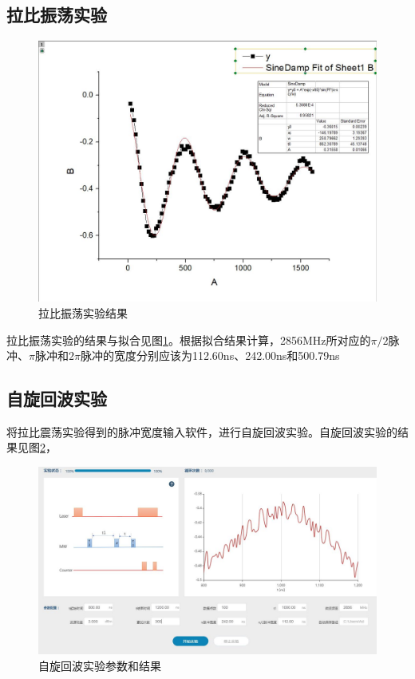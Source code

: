 \documentclass[a4paper]{article}
\begin{document}
\subsection{拉比振荡实验}
\begin{figure}[htbp]
	\centering
	\includegraphics[width=0.7\linewidth]{data/2/1.JPG}
	\caption{拉比振荡实验结果}
	\label{fig:s21}
\end{figure}
拉比振荡实验的结果与拟合见图\ref{fig:s21}。根据拟合结果计算，2856MHz所对应的$\pi/2$脉冲、$\pi$脉冲和$2\pi$脉冲的宽度分别应该为112.60ns、242.00ns和500.79ns

\subsection{自旋回波实验}
将拉比震荡实验得到的脉冲宽度输入软件，进行自旋回波实验。自旋回波实验的结果见图\ref{fig:s31}，
\begin{figure}[htbp]
	\centering
	\includegraphics[width=0.7\linewidth]{data/3/1.JPG}
	\caption{自旋回波实验参数和结果}
	\label{fig:s31}
\end{figure}
\end{document}
